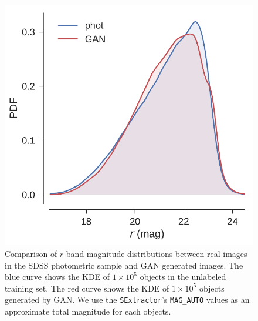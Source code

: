 \begin{figure}
  \centering
  \includegraphics[width=\columnwidth]{figures/mag_kde.pdf}
  \caption{
      Comparison of $r$-band magnitude distributions between real images in the SDSS photometric sample
      and GAN generated images.
      The blue curve shows the KDE of $1 \times 10^5$ objects in the unlabeled training set.
      The red curve shows the KDE of $1 \times 10^5$ objects generated by GAN.
      We use the \texttt{SExtractor}'s \texttt{MAG\_AUTO} values as an approximate total magnitude for each objects.
      }
  \label{fig:mag_kde}
\end{figure}

